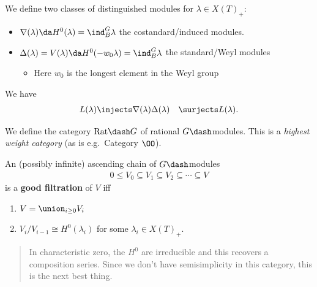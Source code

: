 We define two classes of distinguished modules for
\(\lambda \in X(T)_+\):

\begin{itemize}
\tightlist
\item
  \(\nabla(\lambda) \da H^0(\lambda) = \ind_B^G \lambda\) the
  costandard/induced modules.
\item
  \(\Delta(\lambda) = V(\lambda) \da H^0(-w_0 \lambda) = \ind_B^G \lambda\)
  the standard/Weyl modules

  \begin{itemize}
  \tightlist
  \item
    Here \(w_0\) is the longest element in the Weyl group
  \end{itemize}
\end{itemize}

We have
\begin{align*}  
L(\lambda) &\injects \nabla(\lambda)
\Delta(\lambda) &\surjects L(\lambda)
.\end{align*}

We define the category \(\text{Rat}\dash G\) of rational
\(G\dash\)modules. This is a \emph{highest weight category} (as is
e.g.~Category \(\OO\)).

\begin{definition}

An (possibly infinite) ascending chain of \(G\dash\)modules
\begin{align*}  
0 \leq V_0 \subseteq V_1 \subseteq V_2 \subseteq \cdots \subseteq V
\end{align*} is a \textbf{good filtration} of \(V\) iff

\begin{enumerate}
\def\labelenumi{\arabic{enumi}.}
\item
  \(V = \union_{i\geq 0} V_i\)
\item
  \(V_i/V_{i-1} \cong H^0(\lambda_i)\) for some
  \(\lambda_i \in X(T)_+\).
\end{enumerate}

\begin{quote}
In characteristic zero, the \(H^0\) are irreducible and this recovers a
composition series. Since we don't have semisimplicity in this category,
this is the next best thing.
\end{quote}

\end{definition}

